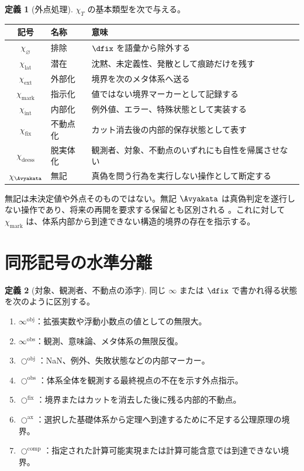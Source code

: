 \documentclass[a4paper,11pt]{ltjsarticle}
\theoremstyle{definition}
\newtheorem{definition}{定義}[section]
\theoremstyle{plain}
\newcommand{\ofix}{\bigcirc^{\mathrm{fix}}}
\newcommand{\oobs}{\bigcirc^{\mathrm{obs}}}
\newcommand{\oobj}{\bigcirc^{\mathrm{obj}}}
\newcommand{\iobs}{\infty^{\mathrm{obs}}}
\newcommand{\iobj}{\infty^{\mathrm{obj}}}
\newcommand{\oax}{\bigcirc^{\mathrm{ax}}}
\newcommand{\ocomp}{\bigcirc^{\mathrm{comp}}}
\begin{document}
\begin{definition}[外点処理]
$\chi_T$ の基本類型を次で与える。
\begin{center}
\begin{tabular}{c l p{}}
\toprule
記号 & 名称 & 意味 \\
\midrule
$\chi_{\varnothing}$ & 排除 & $\dfix$ を語彙から除外する \\
$\chi_{\mathrm{lat}}$ & 潜在 & 沈黙、未定義性、発散として痕跡だけを残す \\
$\chi_{\mathrm{ext}}$ & 外部化 & 境界を次のメタ体系へ送る \\
$\chi_{\mathrm{mark}}$ & 指示化 & 値ではない境界マーカーとして記録する \\
$\chi_{\mathrm{int}}$ & 内部化 & 例外値、エラー、特殊状態として実装する \\
$\chi_{\mathrm{fix}}$ & 不動点化 & カット消去後の内部的保存状態として表す \\
$\chi_{\mathrm{deess}}$ & 脱実体化 & 観測者、対象、不動点のいずれにも自性を帰属させない \\
$\chi_{\Avyakata}$ & 無記 & 真偽を問う行為を実行しない操作として断定する \\
\bottomrule
\end{tabular}
\end{center}
\end{definition}

無記は未決定値や外点そのものではない。無記 $\Avyakata$ は真偽判定を遂行しない操作であり、将来の再開を要求する保留とも区別される \cite{ChibaAvyakata2026}。これに対して $\chi_{\mathrm{mark}}$ は、体系内部から到達できない構造的境界の存在を指示する。

\section{同形記号の水準分離}

\begin{definition}[対象、観測者、不動点の添字]
同じ $\infty$ または $\dfix$ で書かれ得る状態を次のように区別する。
\begin{enumerate}
 \item $\iobj$：拡張実数や浮動小数点の値としての無限大。
 \item $\iobs$：観測、意味論、メタ体系の無限反復。
 \item $\oobj$：NaN、例外、失敗状態などの内部マーカー。
 \item $\oobs$：体系全体を観測する最終視点の不在を示す外点指示。
 \item $\ofix$：境界またはカットを消去した後に残る内部的不動点。
 \item $\oax$：選択した基礎体系から定理へ到達するために不足する公理原理の境界。
 \item $\ocomp$：指定された計算可能実現または計算可能含意では到達できない境界。
\end{enumerate}
\end{definition}
\end{document}

